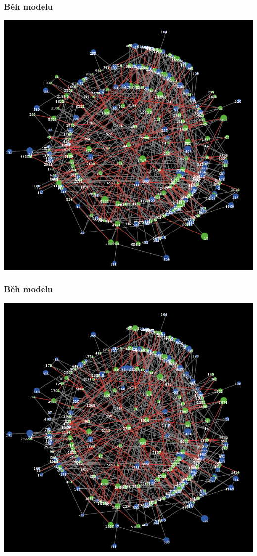 \documentclass[xcolor=dvipsnames]{beamer}
\begin{document}
  \begin{frame}
    \frametitle{Běh modelu}
    \includegraphics[width=0.6\paperwidth]{8.png}
  \end{frame}
  \begin{frame}
    \frametitle{Běh modelu}
    \includegraphics[width=0.6\paperwidth]{9.png}
  \end{frame}
\end{document}
